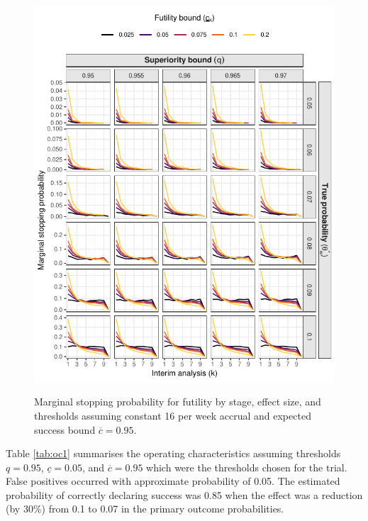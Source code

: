 \documentclass{bmcart}
\begin{document}
\begin{figure}[!ht]
	\caption{Marginal stopping probability for futility by stage, effect size, and thresholds assuming constant 16 per week accrual and expected success bound $\overline{c}=0.95$.}
	\includegraphics{figures/stop_futility_16.pdf}
	\label{fig:stop_futility_16}
\end{figure}

Table \ref{tab:oc1} summarises the operating characteristics assuming thresholds $q=0.95$, $\underline{c}=0.05$, and $\overline{c}=0.95$ which were the thresholds chosen for the trial.
False positives occurred with approximate probability of 0.05.
The estimated probability of correctly declaring success was 0.85 when the effect was a reduction (by 30\%) from 0.1 to 0.07 in the primary outcome probabilities.
\end{document}
